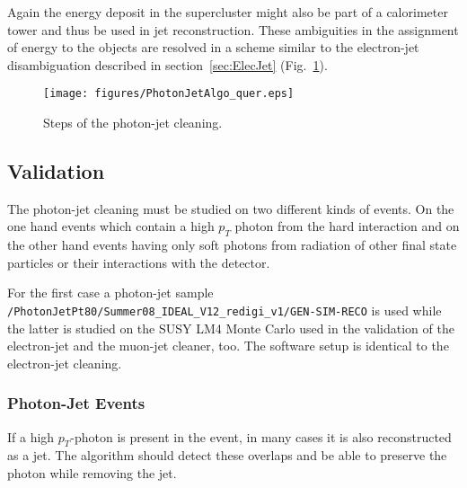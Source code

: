 \documentclass{cmspaper}
\begin{document}
Again the energy deposit in the supercluster might also be part of a
calorimeter tower and thus be used in jet reconstruction. These ambiguities in
the assignment of energy to the objects are resolved in a scheme similar to the
electron-jet disambiguation described in section~\ref{sec:ElecJet}
(Fig.~\ref{fig:PJCleaning}).


\begin{figure}[hbt]
\begin{center}
\texttt{[image: figures/PhotonJetAlgo\_quer.eps]}
\caption{Steps of the photon-jet cleaning.}
\label{fig:PJCleaning}
\end{center}
\end{figure}

\subsection{Validation}
The photon-jet cleaning must be studied on two different kinds of
events. On the one hand events which contain a high $p_T$ photon from the hard
interaction and on the other hand events having only soft photons from
radiation of other final state particles or their interactions with the
detector.

For the first case a photon-jet sample
\newline\texttt{/PhotonJetPt80/Summer08\_IDEAL\_V12\_redigi\_v1/GEN-SIM-RECO} is
used while
the latter is studied on the SUSY LM4 Monte Carlo used in the validation
of the electron-jet and the muon-jet cleaner, too.  The software setup is identical
to the electron-jet cleaning.

\subsubsection{Photon-Jet Events}
If a high $p_T$-photon is present in the event, in many cases
it is also reconstructed as a jet. The algorithm should detect these overlaps and
be able to preserve the photon while removing the jet.
\end{document}
